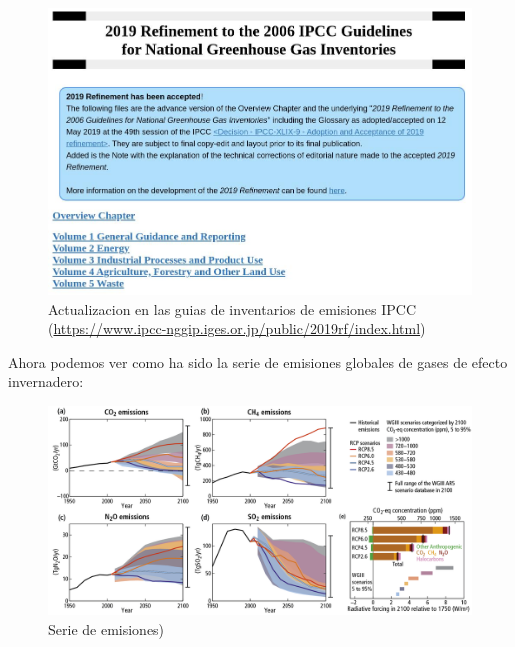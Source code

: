 \documentclass[]{book}
\begin{document}
\begin{figure}
\centering
\includegraphics{figs/ipcc2.jpg}
\caption{\label{fig:unnamed-chunk-23}Actualizacion en las guias de inventarios de emisiones IPCC (\url{https://www.ipcc-nggip.iges.or.jp/public/2019rf/index.html})}
\end{figure}

Ahora podemos ver como ha sido la serie de emisiones globales de gases de efecto invernadero:

\begin{figure}
\includegraphics[width=1.2\linewidth]{figs/ipcc3} \caption{Serie de emisiones)}\label{fig:unnamed-chunk-24}
\end{figure}
\end{document}
